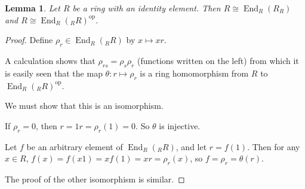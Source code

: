 \documentclass[12pt]{article}
\newtheorem*{lemma}{Lemma}
\newcommand{\End}{\operatorname{End}}
\newcommand{\isom}{\cong}
\begin{document}
\begin{lemma}
Let $R$ be a ring with an identity element.
Then $R \isom \End_R(R_R)$ and $R \isom \End_R({}_RR)^{\text{op}}$.
\end{lemma}

\begin{proof}
Define $\rho_r \in \End_R({}_RR)$ by $x \mapsto xr$.

A calculation shows that $\rho_{rs} = \rho_s \rho_r$ (functions written on the left)
from which it is easily seen that the map $\theta : r \mapsto \rho_r$ is a ring
homomorphism from $R$ to $\End_R({}_RR)^{\text{op}}$.

We must show that this is an isomorphism.

If $\rho_r = 0$, then $r = 1r = \rho_r(1) = 0$.  So $\theta$ is injective.

Let $f$ be an arbitrary element of $\End_R({}_RR)$, and let $r = f(1)$.
Then for any $x \in R$, $f(x) = f(x1) = xf(1) = xr = \rho_r(x)$, so
$f = \rho_r = \theta(r)$.

The proof of the other isomorphism is similar.
\end{proof}
\end{document}
